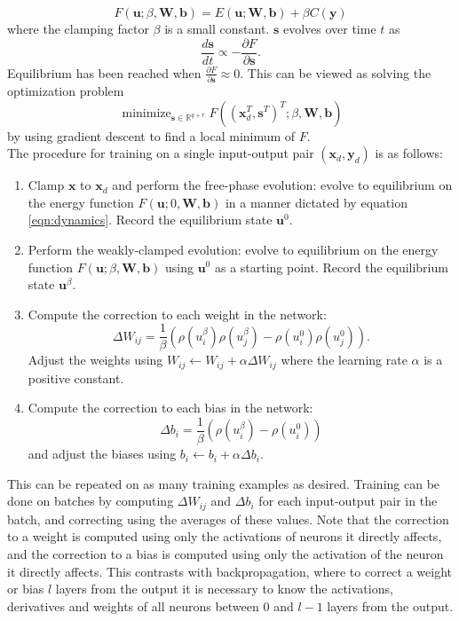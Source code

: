 \documentclass[format=sigconf]{acmart}
\newcommand{\mtx}[1]{\bm{#1}}
\newcommand{\npar}{\\\indent}
\DeclareMathOperator*{\minimize}{minimize}
\begin{document}
\begin{equation}
F(\mtx{u}; \beta, \mtx{W}, \mtx{b})=E(\mtx{u};\mtx{W}, \mtx{b})+\beta C(\mtx{y})
\end{equation}
where the clamping factor $\beta$ is a small constant. $\mtx{s}$ evolves over time $t$ as
\begin{equation}
\label{eqn:dynamics}
\frac{d\mtx{s}}{dt}\propto -\frac{\partial F}{\partial \mtx{s}}.
\end{equation}
Equilibrium has been reached when $\frac{\partial F}{\partial \mtx{s}} \approx 0$. This can be viewed as solving the optimization problem
\begin{equation}
	\minimize_{\mtx{s}\in\mathbb{R}^{q+r}}F((\mtx{x}_d^T,\mtx{s}^T)^T; \beta, \mtx{W}, \mtx{b}) 
\end{equation}
by using gradient descent to find a local minimum of $F$.
\npar
The procedure for training on a single input-output pair $(\mtx{x}_d,\mtx{y}_d)$ is as follows:
\begin{enumerate}
\item Clamp $\mtx{x}$ to $\mtx{x}_d$ and perform the free-phase evolution: evolve to equilibrium on the energy function $F(\mtx{u}; 0, \mtx{W}, \mtx{b})$ in a manner dictated by equation \ref{eqn:dynamics}. Record the equilibrium state $\mtx{u}^0$.
\item Perform the weakly-clamped evolution: evolve to equilibrium on the energy function $F(\mtx{u}; \beta, \mtx{W}, \mtx{b})$ using $\mtx{u}^0$ as a starting point. Record the equilibrium state $\mtx{u}^{\beta}$.
\item Compute the correction to each weight in the network: 
\begin{equation}
\label{eqn:weight_correction}
\Delta W_{ij}=\frac{1}{\beta}(\rho(u_i^\beta)\rho(u_j^\beta)-\rho(u_i^0)\rho(u_j^0)).
\end{equation}
Adjust the weights using $W_{ij}\leftarrow W_{ij}+\alpha\Delta W_{ij}$ where the learning rate $\alpha$ is a positive constant.
\item Compute the correction to each bias in the network:
\begin{equation}
\Delta b_i=\frac{1}{\beta}(\rho(u_i^{\beta})-\rho(u_i^0))
\end{equation}
and adjust the biases using $b_i\leftarrow b_i+\alpha\Delta b_i$.
\end{enumerate}
This can be repeated on as many training examples as desired. Training can be done on batches by computing $\Delta W_{ij}$ and $\Delta b_i$ for each input-output pair in the batch, and correcting using the averages of these values. Note that the correction to a weight is computed using only the activations of neurons it directly affects, and the correction to a bias is computed using only the activation of the neuron it directly affects. This contrasts with backpropagation, where to correct a weight or bias $l$ layers from the output it is necessary to know the activations, derivatives and weights of all neurons between $0$ and $l-1$ layers from the output.
\end{document}
